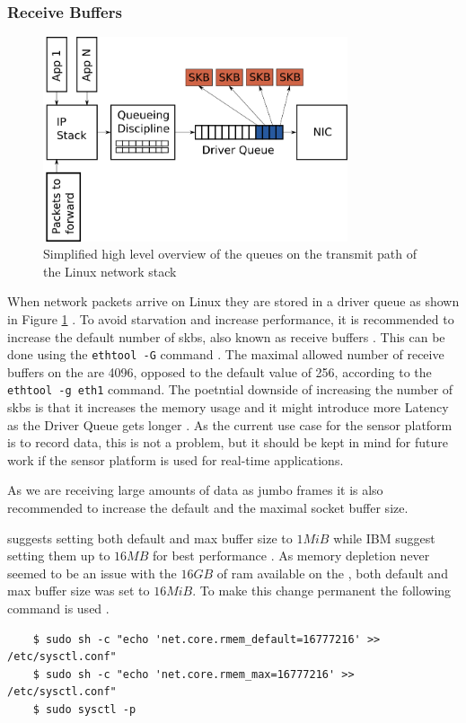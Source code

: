 \subsubsection{Receive Buffers}
\begin{figure}
    \centering
    \includegraphics[width=0.8\textwidth]{figures/linux_networking.png}
    \caption{Simplified high level overview of the queues on the transmit path of the Linux network stack \cite{danQueueingLinuxNetwork2013}}
    \label{fig:linux_network}
\end{figure}
When network packets arrive on Linux they are stored in a driver queue as shown in Figure \ref{fig:linux_network} \cite{danQueueingLinuxNetwork2013}.
To avoid starvation and increase performance, it is recommended to increase the default number of \glspl{skb}, also known as receive buffers \cite{lucidvisionlabsReceiveBuffers2020} \cite{danQueueingLinuxNetwork2013}.
This can be done using the \texttt{ethtool -G} command \cite{danQueueingLinuxNetwork2013}.
The maximal allowed number of receive buffers on the \jx are 4096, opposed to the default value of 256, according to the \texttt{ethtool -g eth1} command.
The poetntial downside of increasing the number of \glspl{skb} is that it increases the memory usage and it might introduce more Latency as the Driver Queue gets longer \cite{danQueueingLinuxNetwork2013}.
As the current use case for the sensor platform is to record data, this is not a problem, but it should be kept in mind for future work if the sensor platform is used for real-time applications.

As we are receiving large amounts of data as jumbo frames it is also recommended to increase the default and the maximal socket buffer size.

\lucid suggests setting both default and max buffer size to $1MiB$ while IBM suggest setting them up to $16MB$ for best performance \cite{lucidvisionlabsReceiveBuffers2020}\cite{ibmIBMDocumentationTCPIP2021}.
As memory depletion never seemed to be an issue with the $16GB$ of \gls{ram} available on the \jx, both default and max buffer size was set to $16MiB$.
To make this change permanent the following command is used \cite{redhat10ChangingNetwork}.
\begin{verbatim}
    $ sudo sh -c "echo 'net.core.rmem_default=16777216' >> /etc/sysctl.conf"
    $ sudo sh -c "echo 'net.core.rmem_max=16777216' >> /etc/sysctl.conf"
    $ sudo sysctl -p
\end{verbatim}

